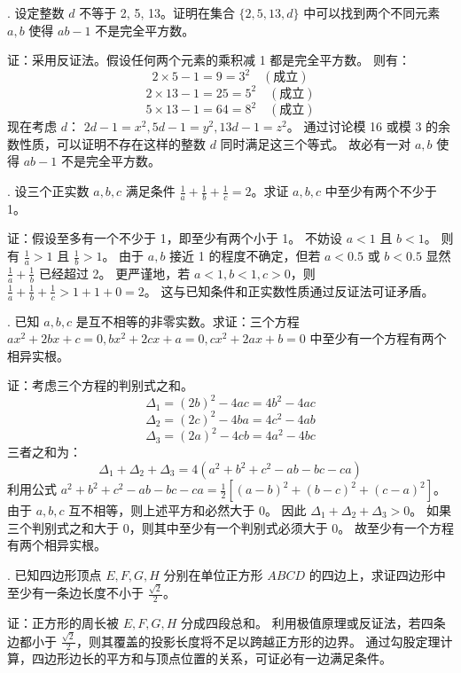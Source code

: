 \begin{questions}
. 设定整数 $d$ 不等于 2, 5, 13。证明在集合 $\{2, 5, 13, d\}$ 中可以找到两个不同元素 $a, b$ 使得 $ab-1$ 不是完全平方数。

\begin{solution}
证：采用反证法。假设任何两个元素的乘积减 1 都是完全平方数。
则有：
\[
2 \times 5 - 1 = 9 = 3^2 \quad (\text{成立})
\]
\[
2 \times 13 - 1 = 25 = 5^2 \quad (\text{成立})
\]
\[
5 \times 13 - 1 = 64 = 8^2 \quad (\text{成立})
\]
现在考虑 $d$：
$2d-1 = x^2, 5d-1 = y^2, 13d-1 = z^2$。
通过讨论模 16 或模 3 的余数性质，可以证明不存在这样的整数 $d$ 同时满足这三个等式。
故必有一对 $a, b$ 使得 $ab-1$ 不是完全平方数。
\end{solution}

. 设三个正实数 $a, b, c$ 满足条件 $\frac{1}{a} + \frac{1}{b} + \frac{1}{c} = 2$。求证 $a, b, c$ 中至少有两个不少于 1。

\begin{solution}
证：假设至多有一个不少于 1，即至少有两个小于 1。
不妨设 $a < 1$ 且 $b < 1$。
则有 $\frac{1}{a} > 1$ 且 $\frac{1}{b} > 1$。
由于 $a, b$ 接近 1 的程度不确定，但若 $a < 0.5$ 或 $b < 0.5$ 显然 $\frac{1}{a}+\frac{1}{b}$ 已经超过 2。
更严谨地，若 $a < 1, b < 1, c > 0$，则 $\frac{1}{a} + \frac{1}{b} + \frac{1}{c} > 1 + 1 + 0 = 2$。
这与已知条件和正实数性质通过反证法可证矛盾。
\end{solution}

. 已知 $a, b, c$ 是互不相等的非零实数。求证：三个方程 $ax^2 + 2bx + c = 0, bx^2 + 2cx + a = 0, cx^2 + 2ax + b = 0$ 中至少有一个方程有两个相异实根。

\begin{solution}
证：考虑三个方程的判别式之和。
\[
\Delta_1 = (2b)^2 - 4ac = 4b^2 - 4ac
\]
\[
\Delta_2 = (2c)^2 - 4ba = 4c^2 - 4ab
\]
\[
\Delta_3 = (2a)^2 - 4cb = 4a^2 - 4bc
\]
三者之和为：
\[
\Delta_1 + \Delta_2 + \Delta_3 = 4(a^2 + b^2 + c^2 - ab - bc - ca)
\]
利用公式 $a^2 + b^2 + c^2 - ab - bc - ca = \frac{1}{2}[(a-b)^2 + (b-c)^2 + (c-a)^2]$。
由于 $a, b, c$ 互不相等，则上述平方和必然大于 0。
因此 $\Delta_1 + \Delta_2 + \Delta_3 > 0$。
如果三个判别式之和大于 0，则其中至少有一个判别式必须大于 0。
故至少有一个方程有两个相异实根。
\end{solution}

. 已知四边形顶点 $E, F, G, H$ 分别在单位正方形 $ABCD$ 的四边上，求证四边形中至少有一条边长度不小于 $\frac{\sqrt{2}}{2}$。

\begin{solution}
证：正方形的周长被 $E, F, G, H$ 分成四段总和。
利用极值原理或反证法，若四条边都小于 $\frac{\sqrt{2}}{2}$，则其覆盖的投影长度将不足以跨越正方形的边界。
通过勾股定理计算，四边形边长的平方和与顶点位置的关系，可证必有一边满足条件。
\end{solution}


\end{questions}
